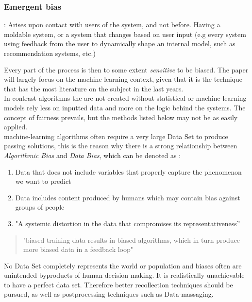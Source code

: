 \subsubsection{Emergent bias}: \label{EmergentBias}
Arises upon contact with users of the system, and not before. Having a moldable system, or a system that changes based on user input (e.g every system using feedback from the user to dynamically shape an internal model, such as recommendation systems, etc.)

Every part of the process is then to some extent \textsl{sensitive} to be biased.
The paper will largely focus on the machine-learning context, given that it is the technique that has the most literature on the subject in the last years.\\
In contrast algorithms the are not created without statistical or machine-learning models rely less on inputted data and more on the logic behind the systems. The concept of fairness prevails, but the methods listed below may not be as easily applied.\\
machine-learning algorithms often require a very large Data Set to produce passing solutions, this is the reason why there is a strong relationship between \textsl{Algorithmic Bias} and \textsl{Data Bias}\label{DataBias}, which can be denoted as :
\begin{enumerate}
  \item Data that does not include variables that properly capture the phenomenon we want to predict
  \item Data includes content produced by humans which may contain bias against groups of people
  \item "A systemic distortion in the data that compromises its representativeness” \cite{OCDK19}
\end{enumerate}
\begin{quote}"biased training data results in biased algorithms, which in turn produce more biased data in a feedback loop"\cite{GSC18} \end{quote}
No Data Set completely represents the world or population and biases often are unintended byproducts of human decision-making\cite{GSC18}. It is realistically unachievable to have a perfect data set. Therefore better recollection techniques should be pursued, as well as postprocessing techniques such as Data-massaging.
